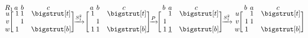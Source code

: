 \documentclass[sn-mathphys]{sn-jnl}
\newcommand\topstrut[1][1.0ex]{\setlength\bigstrutjot{#1}{\bigstrut[t]}}
\newcommand\botstrut[1][0.9ex]{\setlength\bigstrutjot{#1}{\bigstrut[b]}}
\begin{document}
$$
	\def\rowsp{0.2em}
	\def\arraystretch{0.95}
	\makeatletter\setlength\BA@colsep{1.2pt}\makeatother
	\begin{blockarray}{cccc}{R_1}
	 \kern-0.2em  \vspace{-0.3em} & a & b & c  \\
		\begin{block}{c[ccc]}
  		u \kern\rowsp  & \; 1 & 1 &  \hphantom{1} \; \topstrut \\
  		v \kern\rowsp & \;  & 1 &  \hphantom{1} \; \\
  		w \kern\rowsp & \; 1 &  &  \hphantom{1} \; \botstrut \\  
		\end{block}
	\end{blockarray}
	\xrightarrow{S_{1}^2} 
	\begin{blockarray}{cccc}{}
	\kern-0.2em \vspace{-0.3em} & a & b & c  \\
		\begin{block}{c[ccc]}
  		 & \; 1 &  &  \hphantom{1} \; \topstrut \\
  		 & \;  & 1 &  \hphantom{1} \; \\
  		 & \; 1 & 1 & \hphantom{1} \; \botstrut \\
		\end{block}
	\end{blockarray}
		\xrightarrow{P}
	\hspace{-0.2em}
	\begin{blockarray}{cccc}{}
	\kern-0.2em \vspace{-0.3em} & b & a & c  \\
		\begin{block}{c[ccc]}
  		& \;  & 1 &  \hphantom{1} \; \topstrut \\
  		& \; 1 &  &  \hphantom{1} \; \\
  		& \; 1 & \underline{1} &  \hphantom{1} \; \botstrut \\
		\end{block}
	\end{blockarray}
	\xrightarrow{S_1^2}
	\hspace{-0.1em}
	\begin{blockarray}{cccc}{}
	\kern-0.2em \vspace{-0.3em} & b & a & c  \\
		\begin{block}{c[ccc]}
  		u \kern\rowsp & \;  & 1 &  \hphantom{1} \; \topstrut \\
  		v \kern\rowsp & \; 1 & 1 &  \hphantom{1} \; \\
  		w \kern\rowsp & \; 1 &  &  \hphantom{1} \; \botstrut \\
		\end{block}
	\end{blockarray}
$$
\end{document}
